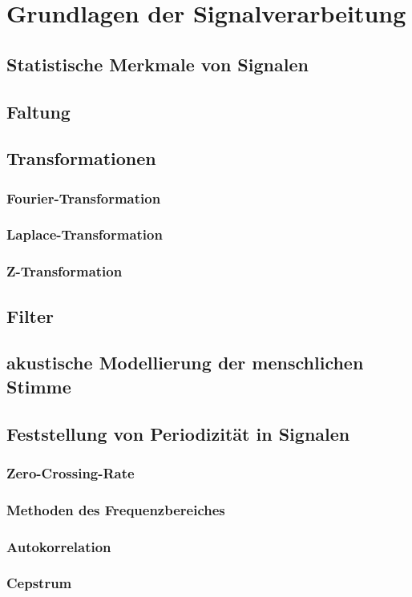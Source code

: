 \chapter{Grundlagen der Signalverarbeitung}
\section{Statistische Merkmale von Signalen}
\section{Faltung}
\section{Transformationen}
\subsection{Fourier-Transformation}
\subsection{Laplace-Transformation}
\subsection{Z-Transformation}
\section{Filter}
\section{akustische Modellierung der menschlichen Stimme}
\section{Feststellung von Periodizität in Signalen}
\subsection{Zero-Crossing-Rate}
\subsection{Methoden des Frequenzbereiches}
\subsection{Autokorrelation}
\subsection{Cepstrum}